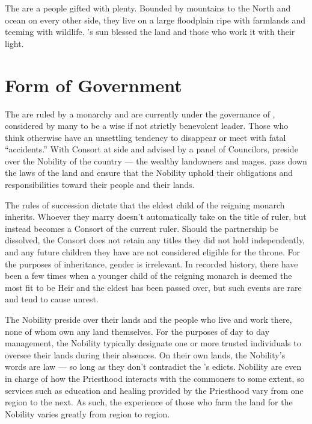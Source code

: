 \documentclass[blue]{GL2020}
\begin{document}
\name{\bAgrarians{}}

The \pFarmers{} are a people gifted with plenty. Bounded by mountains to the North and ocean on every other side, they live on a large floodplain ripe with farmlands and teeming with wildlife.   \cFarmGod{}’s sun blessed the land and those who work it with their light.    

\section*{Form of Government}
The \pFarm{} are ruled by a monarchy and are currently under the governance of \cQueen{\full}, considered by many to be a wise if not strictly benevolent leader. Those who think otherwise have an unsettling tendency to disappear or meet with fatal ``accidents.'' With \cQueen{\their} Consort at \cQueen{\their} side and advised by a panel of Councilors, \cQueen{\they} preside\cQueen{\plural} over the Nobility of the country — the wealthy landowners and mages.  \cQueen{\They} pass\cQueen{\pluralC} down the laws of the land and ensure that the Nobility uphold their obligations and responsibilities toward their people and their lands.

The rules of succession dictate that the eldest child of the reigning monarch inherits. Whoever they marry doesn't automatically take on the title of ruler, but instead becomes a Consort of the current ruler. Should the partnership be dissolved, the Consort does not retain any titles they did not hold independently, and any future children they have are not considered eligible for the throne. For the purposes of inheritance, gender is irrelevant. In recorded history, there have been a few times when a younger child of the reigning monarch is deemed the most fit to be Heir and the eldest has been passed over, but such events are rare and tend to cause unrest.

The Nobility preside over their lands and the people who live and work there, none of whom own any land themselves. For the purposes of day to day management, the Nobility typically designate one or more trusted individuals to oversee their lands during their absences. On their own lands, the Nobility's words are law — so long as they don't contradict the \cQueen{\Majesty}'s edicts. Nobility are even in charge of how the Priesthood interacts with the commoners to some extent, so services such as education and healing provided by the Priesthood vary from one region to the next. As such, the experience of those who farm the land for the Nobility varies greatly from region to region. 
\end{document}
